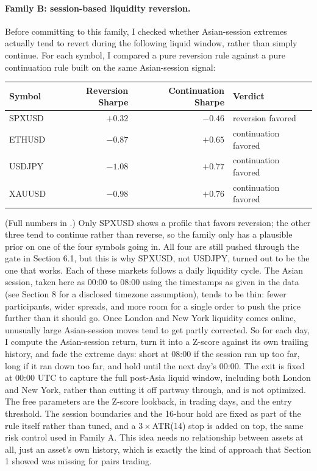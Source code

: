 \documentclass[11pt]{article}
\newcommand{\code}[1]{\texttt{\detokenize{#1}}}
\begin{document}
\paragraph{Family B: session-based liquidity reversion.} Before committing to this family, I checked whether
Asian-session extremes actually tend to revert during the following liquid window, rather than simply continue.
For each symbol, I compared a pure reversion rule against a pure continuation rule built on the same Asian-session
signal:
\begin{table}[H]
\centering\small
\begin{tabular}{lrrl}
\toprule
Symbol & Reversion Sharpe & Continuation Sharpe & Verdict \\
\midrule
SPXUSD & $+0.32$ & $-0.46$ & reversion favored \\
ETHUSD & $-0.87$ & $+0.65$ & continuation favored \\
USDJPY & $-1.08$ & $+0.77$ & continuation favored \\
XAUUSD & $-0.98$ & $+0.76$ & continuation favored \\
\bottomrule
\end{tabular}
\end{table}
(Full numbers in \code{results/session_direction_check.csv}.)
Only SPXUSD shows a profile that favors reversion; the other three tend to continue rather than reverse, so the
family only has a plausible prior on one of the four symbols going in. All four are still pushed through the gate
in Section 6.1, but this is why SPXUSD, not USDJPY, turned out to be the one that works.
Each of these markets follows a daily liquidity cycle. The Asian session, taken here as 00:00 to 08:00 using the
timestamps as given in the data (see Section 8 for a disclosed timezone assumption), tends to be thin: fewer
participants, wider spreads, and more room for a single order to push the price further than it should go. Once
London and New York liquidity comes online, unusually large Asian-session moves tend to get partly corrected. So
for each day, I compute the Asian-session return, turn it into a Z-score against its own trailing history, and fade
the extreme days: short at 08:00 if the session ran up too far, long if it ran down too far, and hold until the
next day's 00:00. The exit is fixed at 00:00 UTC to capture the full post-Asia liquid window, including both London
and New York, rather than cutting it off partway through, and is not optimized. The free parameters are the
Z-score lookback, in trading days, and the entry threshold. The session boundaries and the 16-hour hold are fixed
as part of the rule itself rather than tuned, and a $3\times$ATR(14) stop is added on top, the same risk control
used in Family A. This idea needs no relationship between assets at all, just an asset's own history, which is
exactly the kind of approach that Section 1 showed was missing for pairs trading.
\end{document}

